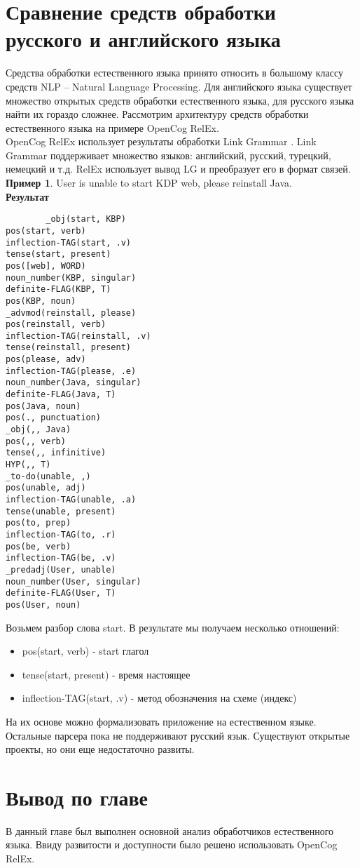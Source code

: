 \section{Сравнение средств обработки русского и английского языка} \label{sect2_3}
Средства обработки естественного языка принято относить в большому классу средств NLP – Natural Language Processing. Для английского языка существует множество открытых средств обработки естественного языка, для русского языка найти их гораздо сложнее. Рассмотрим архитектуру средств обработки естественного языка на примере OpenCog RelEx. \\
OpenCog RelEx использует результаты обработки Link Grammar \cite{linkgrammar}. Link Grammar поддерживает множество языков: английский, русский, турецкий, немецкий и т.д.  RelEx использует вывод LG и преобразует его в формат связей.
\textbf{Пример 1}. User is unable to start KDP web, please reinstall Java.\\
\textbf{Результат} 
\begin{verbatim}
		_obj(start, KBP)
pos(start, verb)
inflection-TAG(start, .v)
tense(start, present)
pos([web], WORD)
noun_number(KBP, singular)
definite-FLAG(KBP, T)
pos(KBP, noun)
_advmod(reinstall, please)
pos(reinstall, verb)
inflection-TAG(reinstall, .v)
tense(reinstall, present)
pos(please, adv)
inflection-TAG(please, .e)
noun_number(Java, singular)
definite-FLAG(Java, T)
pos(Java, noun)
pos(., punctuation)
_obj(,, Java)
pos(,, verb)
tense(,, infinitive)
HYP(,, T)
_to-do(unable, ,)
pos(unable, adj)
inflection-TAG(unable, .a)
tense(unable, present)
pos(to, prep)
inflection-TAG(to, .r)
pos(be, verb)
inflection-TAG(be, .v)
_predadj(User, unable)
noun_number(User, singular)
definite-FLAG(User, T)
pos(User, noun)

\end{verbatim}



Возьмем разбор слова start. В результате мы получаем несколько отношений:
\begin{itemize}
	\item pos(start, verb) - start глагол
	\item tense(start, present) - время настоящее
	\item inflection-TAG(start, .v) -  метод обозначения на схеме (индекс)
\end{itemize}

На их основе можно формализовать приложение на естественном языке. Остальные парсера пока не поддерживают русский язык. Существуют открытые проекты, но они еще недостаточно развиты.
\section{Вывод по главе} \label{sect2_4}
В данный главе был выполнен основной анализ обработчиков естественного языка. Ввиду развитости и доступности было решено использовать OpenCog RelEx.
\clearpage
